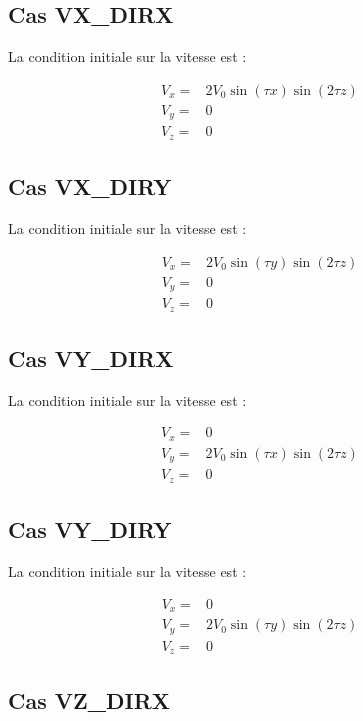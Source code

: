 \subsection{Cas VX\_DIRX}

La condition initiale sur la vitesse est :

\begin{align*}
V_x ={}& 2 V_0 \sin(\tau x) \sin(2 \tau z) \\
V_y ={}& 0 \\
V_z ={}& 0
\end{align*}

\subsection{Cas VX\_DIRY}

La condition initiale sur la vitesse est :

\begin{align*}
V_x ={}& 2 V_0 \sin(\tau y) \sin(2 \tau z) \\
V_y ={}& 0 \\
V_z ={}& 0
\end{align*}

\subsection{Cas VY\_DIRX}

La condition initiale sur la vitesse est :

\begin{align*}
V_x ={}& 0 \\
V_y ={}& 2 V_0 \sin(\tau x) \sin(2 \tau z) \\
V_z ={}& 0
\end{align*}

\subsection{Cas VY\_DIRY}

La condition initiale sur la vitesse est :

\begin{align*}
V_x ={}& 0 \\
V_y ={}& 2 V_0 \sin(\tau y) \sin(2 \tau z) \\
V_z ={}& 0
\end{align*}

\subsection{Cas VZ\_DIRX}

